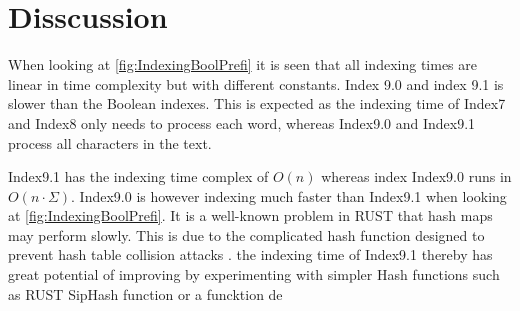 \section{Disscussion}
When looking at \ref{fig:IndexingBoolPrefi} it is seen that all indexing times are linear in time complexity but with different constants. Index 9.0 and index 9.1 is slower than the Boolean indexes. This is expected as the indexing time of Index7 and Index8 only needs to process each word, whereas Index9.0 and Index9.1 process all characters in the text.

Index9.1 has the indexing time complex of $O(n)$ whereas index Index9.0 runs in $O(n\cdot \Sigma)$. Index9.0 is however indexing much faster than Index9.1 when looking at \ref{fig:IndexingBoolPrefi}. It is a well-known problem in RUST that hash maps may perform slowly. This is due to the complicated hash function designed to prevent hash table collision attacks \cite{FAQ}. the indexing time of Index9.1 thereby has great potential of improving by experimenting with simpler Hash functions such as RUST SipHash function or a funcktion de   